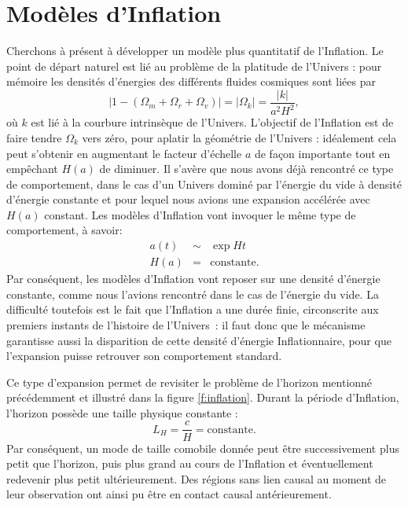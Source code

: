 \section{Modèles d'Inflation}
Cherchons à présent à développer un modèle plus quantitatif de l'Inflation. Le point de départ naturel est lié au problème de la platitude de l'Univers : pour mémoire les densités d'énergies des différents fluides cosmiques sont liées par 
\begin{equation}
|1-(\Omega_m+\Omega_r+\Omega_v)|=|\Omega_k|=\frac{|k|}{a^2H^2},
\end{equation}
où $k$ est lié à la courbure intrinsèque de l'Univers. L'objectif de l'Inflation est de faire tendre $\Omega_k$ vers zéro, pour aplatir la géométrie de l'Univers : idéalement cela peut s'obtenir en augmentant le facteur d'échelle $a$ de façon importante tout en empêchant $H(a)$ de diminuer. Il s'avère que nous avons déjà rencontré ce type de comportement, dans le cas d'un Univers dominé par l'énergie du vide à densité d'énergie constante et pour lequel nous avions une expansion accélérée avec $H(a)$ constant. Les modèles d'Inflation vont invoquer le même type de comportement, à savoir:
\begin{eqnarray}
a(t)&\sim&\exp{Ht}\\
H(a)&=&\mathrm{constante}.
\end{eqnarray} 
Par conséquent, les modèles d'Inflation vont reposer sur une densité d'énergie constante, comme nous l'avions rencontré dans le cas de l'énergie du vide. La difficulté toutefois est le fait que l'Inflation a une durée finie, circonscrite aux premiers instants de l'histoire de l'Univers~: il faut donc que le mécanisme garantisse aussi la disparition de cette densité d'énergie Inflationnaire, pour que l'expansion puisse retrouver son comportement standard.

Ce type d'expansion permet de revisiter le problème de l'horizon mentionné précédemment et illustré dans la figure \ref{f:inflation}. Durant la période d'Inflation, l'horizon possède une taille physique constante :
\begin{equation}
L_H=\frac{c}{H}=\mathrm{constante}.
\end{equation}
Par conséquent, un mode de taille comobile donnée peut être successivement plus petit que l'horizon, puis plus grand au cours de l'Inflation et éventuellement redevenir plus petit ultérieurement. Des régions sans lien causal au moment de leur observation ont ainsi pu être en contact causal antérieurement.


